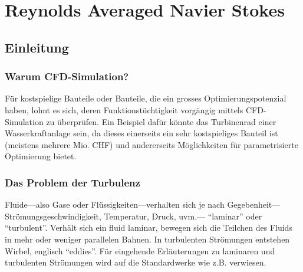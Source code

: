 %
%
%
%
\chapter{Reynolds Averaged Navier Stokes \label{chapter:reynolds}}
\begin{refsection}
%
%
%
%

\section{Einleitung}
%

\subsection{Warum CFD-Simulation?}

Für kostspielige Bauteile oder Bauteile, die ein grosses Optimierungspotenzial haben,
%
lohnt es sich, deren Funktionstüchtigkeit vorgängig mittels CFD-Simulation zu überprüfen.
%
Ein Beispiel dafür könnte das Turbinenrad einer Wasserkraftanlage sein,
%
%
da dieses einerseits ein sehr kostspieliges Bauteil ist (meistens mehrere Mio. CHF)
und andererseits Möglichkeiten für parametrisierte Optimierung bietet.
%

\subsection{Das Problem der Turbulenz}

Fluide---also Gase oder Flüssigkeiten---verhalten sich je nach Gegebenheit---Strömungs\-ge\-schwindigkeit, Temperatur, Druck, uvm.---
%
%
%
%
``laminar'' oder ``turbulent''. Verhält sich ein fluid laminar, bewegen sich die Teilchen des Fluids in mehr oder weniger
%
%
parallelen Bahnen. In turbulenten Strömungen entstehen Wirbel, englisch ``eddies''. Für eingehende Erläuterungen zu laminaren
%
%
und turbulenten Strömungen wird auf die Standardwerke wie z.B. \cite{reynolds:oertel} verwiesen.


\end{refsection}

